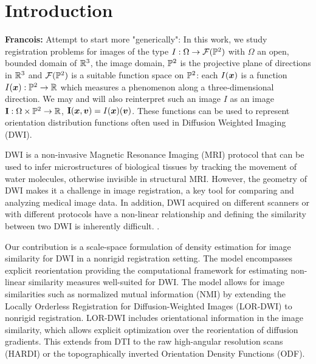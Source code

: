 \documentclass[twocolumn]{svjour3}
\newcommand{\francois}[1]{{\color{red}\textbf{Francois: }#1}}
\newcommand{\francois}[1]{{}}
\begin{document}
%



\section{Introduction}
\francois{Attempt to start more "generically":}
In this work, we study registration problems for images of the type $I:\Omega\to {\mathcal F}({\mathbb P}^2)$ with $\Omega$ an open, bounded domain of ${\mathbb R}^3$, 
the image domain, ${\mathbb P}^2$ is the projective plane of directions in ${\mathbb R}^3$ and ${\mathcal F}({\mathbb P}^2)$ is a suitable function space on ${\mathbb P}^2$: each $I(\boldsymbol{x})$ is a function  $I(\boldsymbol{x}):{\mathbb P}^2\to{\mathbb R}$ which measures a phenomenon along a three-dimensional direction. We may and will also reinterpret such an image $I$ as an image ${\bf I}:\Omega\times{\mathbb P}^2\to{\mathbb R}$, ${\bf I}(\boldsymbol{x}, \boldsymbol{v}) = I(\boldsymbol{x})(\boldsymbol{v})$. These functions can be used to represent orientation distribution functions often used in Diffusion Weighted Imaging (DWI).

DWI is a non-invasive Magnetic Resonance Imaging (MRI) protocol that can
be used to infer microstructures of biological tissues by tracking the movement of water molecules, otherwise
invisible in structural MRI. However, the geometry of DWI makes it a challenge in image
registration, a key tool for comparing and analyzing medical image data. In addition, DWI
acquired on different scanners or with different protocols have a non-linear relationship
and defining the similarity between two DWI is inherently
difficult. \cite{johansen2013diffusion}.


Our contribution is a scale-space formulation of density estimation for image similarity
for DWI in a nonrigid registration setting. The model encompasses explicit reorientation
providing the computational framework for estimating non-linear similarity measures
well-suited for DWI. The model allows for image similarities such as normalized mutual
information (NMI) by extending the Locally Orderless Registration for Diffusion-Weighted
Images (LOR-DWI) \cite{jensen2015locally} to nonrigid registration. LOR-DWI includes
orientational information in the image similarity, which allows explicit optimization over
the reorientation of diffusion gradients. This extends from DTI to the raw high-angular
resolution scans (HARDI) or the topographically inverted Orientation Density Functions
(ODF).
\end{document}
